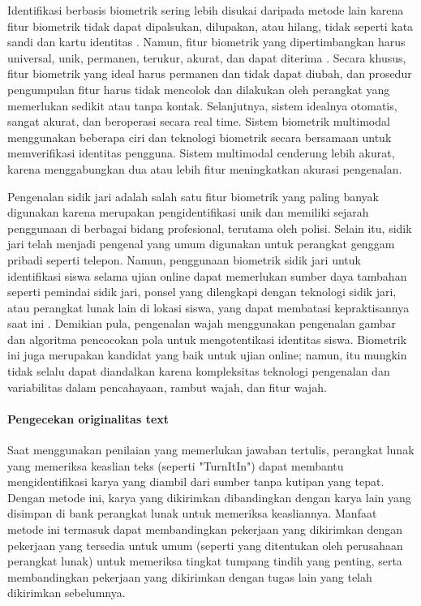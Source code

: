 Identifikasi berbasis biometrik sering lebih disukai daripada metode lain karena fitur biometrik tidak dapat dipalsukan, dilupakan, atau hilang, tidak seperti kata sandi dan kartu identitas \citep{prabhakar2002decision}\citep{rudrapal2012voice}. Namun, fitur biometrik yang dipertimbangkan harus universal, unik, permanen, terukur, akurat, dan dapat diterima \citep{frischholz2000biold}. Secara khusus, fitur biometrik yang ideal harus permanen dan tidak dapat diubah, dan prosedur pengumpulan fitur harus tidak mencolok dan dilakukan oleh perangkat yang memerlukan sedikit atau tanpa kontak. Selanjutnya, sistem idealnya otomatis, sangat akurat, dan beroperasi secara real time. Sistem biometrik multimodal menggunakan beberapa ciri dan teknologi biometrik secara bersamaan untuk memverifikasi identitas pengguna. Sistem multimodal cenderung lebih akurat, karena menggabungkan dua atau lebih fitur meningkatkan akurasi pengenalan.

Pengenalan sidik jari adalah salah satu fitur biometrik yang paling banyak digunakan karena merupakan pengidentifikasi unik \citep{aggarwal2008gradient} dan memiliki sejarah penggunaan di berbagai bidang profesional, terutama oleh polisi. Selain itu, sidik jari telah menjadi pengenal yang umum digunakan untuk perangkat genggam pribadi seperti telepon. Namun, penggunaan biometrik sidik jari untuk identifikasi siswa selama ujian online dapat memerlukan sumber daya tambahan seperti pemindai sidik jari, ponsel yang dilengkapi dengan teknologi sidik jari, atau perangkat lunak lain di lokasi siswa, yang dapat membatasi kepraktisannya saat ini \citep{ullah2012using}. Demikian pula, pengenalan wajah menggunakan pengenalan gambar dan algoritma pencocokan pola untuk mengotentikasi identitas siswa. Biometrik ini juga merupakan kandidat yang baik untuk ujian online; namun, itu mungkin tidak selalu dapat diandalkan karena kompleksitas teknologi pengenalan dan variabilitas dalam pencahayaan, rambut wajah, dan fitur wajah.

\paragraph{Pengecekan originalitas text}
\label{par:originalitastext}

Saat menggunakan penilaian yang memerlukan jawaban tertulis, perangkat lunak yang memeriksa keaslian teks (seperti "TurnItIn") dapat membantu mengidentifikasi karya yang diambil dari sumber tanpa kutipan yang tepat. Dengan metode ini, karya yang dikirimkan dibandingkan dengan karya lain yang disimpan di bank perangkat lunak untuk memeriksa keasliannya. Manfaat metode ini termasuk dapat membandingkan pekerjaan yang dikirimkan dengan pekerjaan yang tersedia untuk umum (seperti yang ditentukan oleh perusahaan perangkat lunak) untuk memeriksa tingkat tumpang tindih yang penting, serta membandingkan pekerjaan yang dikirimkan dengan tugas lain yang telah dikirimkan sebelumnya.

